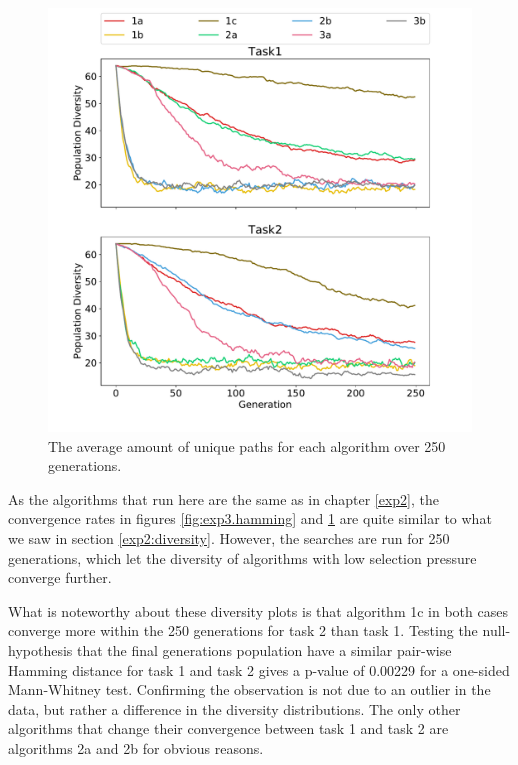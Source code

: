 \begin{figure}[!ht]
    \includegraphics[width=\textwidth, center]{Chapters/4.Experiments/exp3/figures/diversity_frequency.pdf}
    \caption[Frequency diversity plot]{The average amount of unique paths for each algorithm over 250 generations.}
    \label{fig:exp3.frequency}
\end{figure}

As the algorithms that run here are the same as in chapter \ref{exp2}, the convergence rates in figures \ref{fig:exp3.hamming} and \ref{fig:exp3.frequency} are quite similar to what we saw in section \ref{exp2:diversity}. However, the searches are run for 250 generations, which let the diversity of algorithms with low selection pressure converge further.

What is noteworthy about these diversity plots is that algorithm 1c in both cases converge more within the 250 generations for task 2 than task 1. Testing the null-hypothesis that the final generations population have a similar pair-wise Hamming distance for task 1 and task 2 gives a p-value of 0.00229 for a one-sided Mann-Whitney test. Confirming the observation is not due to an outlier in the data, but rather a difference in the diversity distributions. The only other algorithms that change their convergence between task 1 and task 2 are algorithms 2a and 2b for obvious reasons.  

